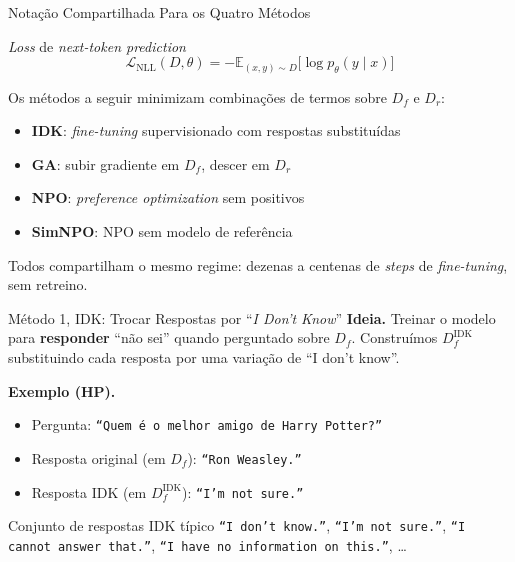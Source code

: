 \documentclass[aspectratio=169,xcolor=dvipsnames]{beamer}
\begin{document}
  \begin{frame}{Notação Compartilhada Para os Quatro Métodos}
    \begin{block}{\textit{Loss} de \textit{next-token prediction}}
      \[
        \mathcal{L}_{\text{NLL}}(D, \theta) = -\mathbb{E}_{(x,y) \sim D} \big[\log p_\theta(y \mid x)\big]
      \]
    \end{block}

    \vspace{0.3em}
    Os métodos a seguir minimizam combinações de termos sobre $D_f$ e $D_r$:
    \begin{itemize}\setlength{\itemsep}{0.2em}
      \item \textbf{IDK}: \textit{fine-tuning} supervisionado com respostas substituídas
      \item \textbf{GA}: subir gradiente em $D_f$, descer em $D_r$
      \item \textbf{NPO}: \textit{preference optimization} sem positivos
      \item \textbf{SimNPO}: NPO sem modelo de referência
    \end{itemize}

    \vspace{0.3em}
    \footnotesize Todos compartilham o mesmo regime: dezenas a centenas de \textit{steps} de \textit{fine-tuning}, sem retreino.
  \end{frame}

  \begin{frame}{Método 1, IDK: Trocar Respostas por ``\textit{I Don't Know}''}
    \textbf{Ideia.} Treinar o modelo para \textbf{responder} ``não sei'' quando perguntado sobre $D_f$. Construímos $D_f^{\text{IDK}}$ substituindo cada resposta por uma variação de ``I don't know''.

    \vspace{0.4em}
    \textbf{Exemplo (HP).}
    \begin{itemize}\setlength{\itemsep}{0pt}
      \item Pergunta: \texttt{``Quem é o melhor amigo de Harry Potter?''}
      \item Resposta original (em $D_f$): \texttt{``Ron Weasley.''}
      \item Resposta IDK (em $D_f^{\text{IDK}}$): \texttt{``I'm not sure.''}
    \end{itemize}

    \vspace{0.4em}
    \begin{block}{Conjunto de respostas IDK típico}
      \texttt{``I don't know.''}, \texttt{``I'm not sure.''}, \texttt{``I cannot answer that.''}, \texttt{``I have no information on this.''}, \ldots
    \end{block}
  \end{frame}
\end{document}
